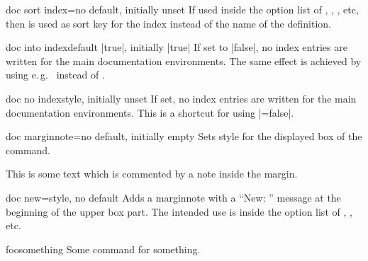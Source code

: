 \begin{docTcbKey}[][doc new={2020-04-23}]{doc sort index}{=}{no default, initially unset}
  If used inside the option list of , ,
  , etc, then  is used
  as sort key for the index instead of the name of the definition.
\begin{dispListing}
\begin{docCommands}[
    doc name        = l_tcobox_example_tl,
    doc sort index  = example_tl,  %
  ]{}
\end{docCommands}
\end{dispListing}
\end{docTcbKey}

\clearpage

\begin{docTcbKey}{doc into index}{}{default |true|, initially |true|}
  If set to |false|, no index entries are written for the main documentation
  environments. The same effect is achieved by using e.\,g.\ 
  instead of .
\end{docTcbKey}


\begin{docTcbKey}[][doc new={2020-04-22}]{doc no index}{}{style, initially unset}
  If set, no index entries are written for the main documentation
  environments. This is a shortcut for using |=false|.
\end{docTcbKey}



\begin{docTcbKey}[][doc new=2014-09-19]{doc marginnote}{=}{no default, initially empty}
  Sets style  for the displayed box of the  command.
\begin{dispExample}
%
This is some text
which is commented by a note inside the margin.
\end{dispExample}
\end{docTcbKey}

\begin{docTcbKey}[][doc new=2014-09-19]{doc new}{=}{style, no default}
  Adds a marginnote with a \enquote{New: } message at the beginning of
  the upper box part. The intended use is inside the option list of
  , , etc.
  \makeatletter\renewcommand*{\tcbdocnew}[1]{\kvtcb@text@new: #1}\makeatother%
\begin{dispExample}
\begin{docCommand}[doc new=2000-01-01]{foosomething}{}
Some command for something.
\end{docCommand}
\end{dispExample}
\end{docTcbKey}


